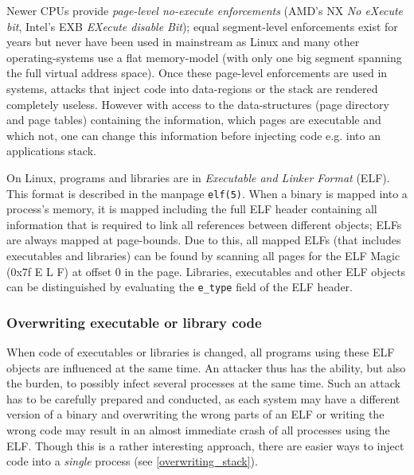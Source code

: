Newer CPUs provide \emph{page-level no-execute enforcements} (AMD's NX \emph{No
eXecute bit}, Intel's EXB \emph{EXecute disable Bit}); equal segment-level
enforcements exist for years but never have been used in mainstream as Linux and
many other operating-systems use a flat memory-model (with only one big segment
spanning the full virtual address space).  Once these page-level enforcements
are used in systems, attacks that inject code into data-regions or the stack are
rendered completely useless. However with access to the data-structures (page
directory and page tables) containing the information, which pages are
executable and which not, one can change this information before injecting code
e.g. into an applications stack. 

On Linux, programs and libraries are in \emph{Executable and Linker Format}
(ELF).  This format is described in the manpage \texttt{elf(5)}. When a binary
is mapped into a process's memory, it is mapped including the full ELF header
containing all information that is required to link all references between
different objects; ELFs are always mapped at page-bounds. Due to this, all
mapped ELFs (that includes executables and libraries) can be found by scanning
all pages for the ELF Magic (0x7f E L F) at offset $0$ in the page.  Libraries,
executables and other ELF objects can be distinguished by evaluating the
\texttt{e\_type} field of the ELF header.

\subsubsection{Overwriting executable or library code}

When code of executables or libraries is changed, all programs using these ELF
objects are influenced at the same time. An attacker thus has the ability, but
also the burden, to possibly infect several processes at the same time. Such an
attack has to be carefully prepared and conducted, as each system may have a
different version of a binary and overwriting the wrong parts of an ELF or
writing the wrong code may result in an almost immediate crash of all processes
using the ELF. Though this is a rather interesting approach, there are easier
ways to inject code into a \emph{single} process (see \ref{overwriting_stack}).

